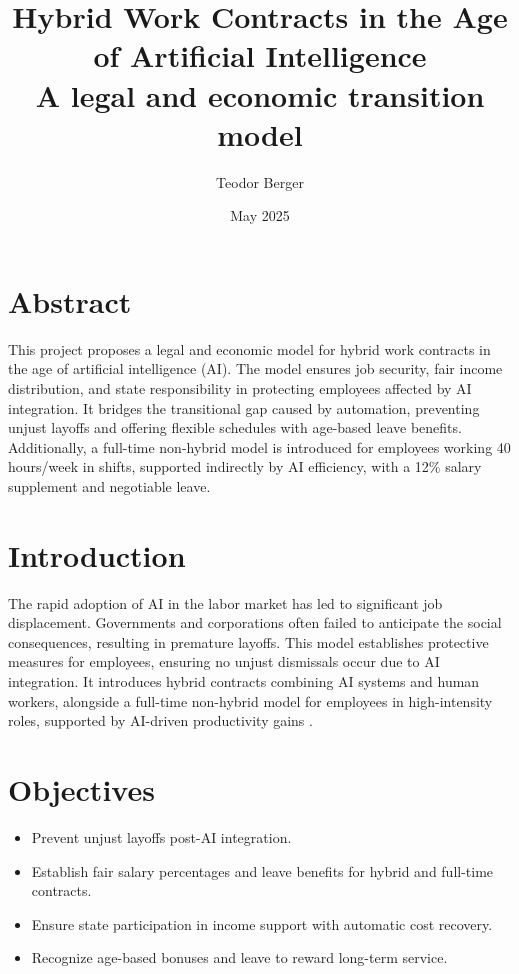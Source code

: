 \documentclass[12pt]{article}
\title{\textbf{Hybrid Work Contracts in the Age of Artificial Intelligence}\\[0.5em]
\large A legal and economic transition model}
\author{Teodor Berger}
\date{May 2025}
\begin{document}
\sloppy %
\maketitle

\section*{Abstract}
This project proposes a legal and economic model for hybrid work contracts in the age of artificial intelligence (AI). The model ensures job security, fair income distribution, and state responsibility in protecting employees affected by AI integration. It bridges the transitional gap caused by automation, preventing unjust layoffs and offering flexible schedules with age-based leave benefits. Additionally, a full-time non-hybrid model is introduced for employees working 40 hours/week in shifts, supported indirectly by AI efficiency, with a 12\% salary supplement and negotiable leave.

\section{Introduction}
The rapid adoption of AI in the labor market has led to significant job displacement. Governments and corporations often failed to anticipate the social consequences, resulting in premature layoffs. This model establishes protective measures for employees, ensuring no unjust dismissals occur due to AI integration. It introduces hybrid contracts combining AI systems and human workers, alongside a full-time non-hybrid model for employees in high-intensity roles, supported by AI-driven productivity gains \cite{brynjolfsson2023,acemoglu2021,arntz2016}.

\section{Objectives}
\begin{itemize}
  \item Prevent unjust layoffs post-AI integration.
  \item Establish fair salary percentages and leave benefits for hybrid and full-time contracts.
  \item Ensure state participation in income support with automatic cost recovery.
  \item Recognize age-based bonuses and leave to reward long-term service.
\end{itemize}
\end{document}

